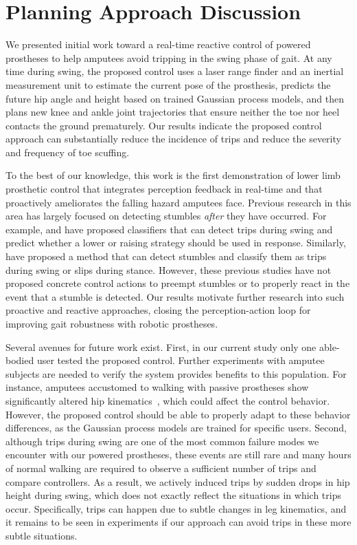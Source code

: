 \section{Planning Approach Discussion}

We presented initial work toward a real-time reactive control of powered
prostheses to help amputees avoid tripping in the swing phase of gait. At any
time during swing, the proposed control uses a laser range finder and an
inertial measurement unit to estimate the current pose of the prosthesis,
predicts the future hip angle and height based on trained Gaussian process
models, and then plans new knee and ankle joint trajectories that ensure neither
the toe nor heel contacts the ground prematurely. Our results indicate the
proposed control approach can substantially reduce the incidence of trips and
reduce the severity and frequency of toe scuffing.

To the best of our knowledge, this work is the first demonstration of lower limb
prosthetic control that integrates perception feedback in real-time and that
proactively ameliorates the falling hazard amputees face. Previous research in
this area has largely focused on detecting stumbles \emph{after} they have
occurred. For example, \citet{lawson2010stumble} and \citet{shirota2014recovery}
have proposed classifiers that can detect trips during swing and predict whether
a lower or raising strategy should be used in response. Similarly,
\citet{zhang2011towards} have proposed a method that can detect stumbles and
classify them as trips during swing or slips during stance. However, these
previous studies have not proposed concrete control actions to preempt stumbles
or to properly react in the event that a stumble is detected. Our results
motivate further research into such proactive and reactive approaches, closing
the perception-action loop for improving gait robustness with robotic
prostheses.

Several avenues for future work exist. First, in our current study only one
able-bodied user tested the proposed control. Further experiments with amputee
subjects are needed to verify the system provides benefits to this population.
For instance, amputees accustomed to walking with passive prostheses show
significantly altered hip kinematics~\citep{jaegers1995prosthetic}, which could
affect the control behavior. However, the proposed control should be able to
properly adapt to these behavior differences, as the Gaussian process models are
trained for specific users. Second, although trips during swing are one of the
most common failure modes we encounter with our powered prostheses, these events
are still rare and many hours of normal walking are required to observe a
sufficient number of trips and compare controllers. As a result, we actively
induced trips by sudden drops in hip height during swing, which does not exactly
reflect the situations in which trips occur.  Specifically, trips can happen due
to subtle changes in leg kinematics, and it remains to be seen in experiments if
our approach can avoid trips in these more subtle situations.


